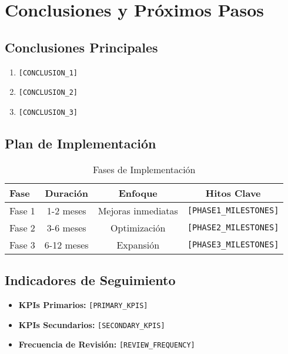 \documentclass[12pt,a4paper]{article}
\begin{document}
\section{\textcolor{primaryblue}{Conclusiones y Próximos Pasos}}

\subsection{Conclusiones Principales}

\begin{enumerate}
    \item \texttt{[CONCLUSION\_1]}
    \item \texttt{[CONCLUSION\_2]}
    \item \texttt{[CONCLUSION\_3]}
\end{enumerate}

\subsection{Plan de Implementación}

\begin{table}[H]
\centering
\begin{tabular}{@{}lccc@{}}
\toprule
\textbf{Fase} & \textbf{Duración} & \textbf{Enfoque} & \textbf{Hitos Clave} \\
\midrule
Fase 1 & 1-2 meses & Mejoras inmediatas & \texttt{[PHASE1\_MILESTONES]} \\
Fase 2 & 3-6 meses & Optimización & \texttt{[PHASE2\_MILESTONES]} \\
Fase 3 & 6-12 meses & Expansión & \texttt{[PHASE3\_MILESTONES]} \\
\bottomrule
\end{tabular}
\caption{Fases de Implementación}
\label{tab:implementation}
\end{table}

\subsection{Indicadores de Seguimiento}

\begin{itemize}
    \item \textbf{KPIs Primarios:} \texttt{[PRIMARY\_KPIS]}
    \item \textbf{KPIs Secundarios:} \texttt{[SECONDARY\_KPIS]}
    \item \textbf{Frecuencia de Revisión:} \texttt{[REVIEW\_FREQUENCY]}
\end{itemize}
\end{document}
